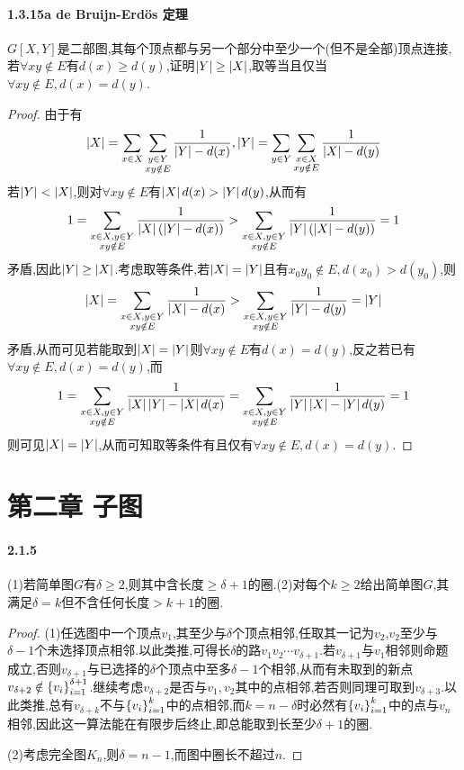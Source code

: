 \documentclass[11pt]{article}
\begin{document}
\paragraph{1.3.15a de Bruijn-Erd\"os 定理}$G[X, Y]$是二部图,其每个顶点都与另一个部分中至少一个(但不是全部)顶点连接,若$\forall xy\notin E$有$d(x)\geq d(y)$,证明$\left|Y\right|\geq \left|X\right|$,取等当且仅当$\forall xy\notin E, d(x)=d(y)$.
\begin{proof}
由于有
$$\left|X\right|=\sum_{x\in X}\sum_{\substack{y\in Y\\ xy\notin E}}\frac{1}{\left|Y\right|-d(x)}, \left|Y\right|=\sum_{y\in Y}\sum_{\substack{x\in X\\ xy\notin E}}\frac{1}{\left|X\right|-d(y)}$$
若$\left|Y\right|<\left|X\right|$,则对$\forall xy\notin E$有$\left|X\right|d(x)>\left|Y\right|d(y)$,从而有
$$1=\sum_{\substack{x\in X, y\in Y\\ xy\notin E}}\frac{1}{\left|X\right|(\left|Y\right|-d(x))}>\sum_{\substack{x\in X, y\in Y\\ xy\notin E}}\frac{1}{\left|Y\right|(\left|X\right|-d(y))}=1$$
矛盾,因此$\left|Y\right|\geq \left|X\right|$.考虑取等条件,若$\left|X\right|=\left|Y\right|$且有$x_0y_0\notin E, d(x_0)>d(y_0)$,则
$$\left|X\right|=\sum_{\substack{x\in X, y\in Y\\ xy\notin E}}\frac{1}{\left|X\right|-d(x)}>\sum_{\substack{x\in X, y\in Y\\ xy\notin E}}\frac{1}{\left|Y\right|-d(y)}=\left|Y\right|$$
矛盾,从而可见若能取到$\left|X\right|=\left|Y\right|$则$\forall xy\notin E$有$d(x)=d(y)$,反之若已有$\forall xy\notin E, d(x)=d(y)$,而
$$1=\sum_{\substack{x\in X, y\in Y\\ xy\notin E}}\frac{1}{\left|X\right|\left|Y\right|-\left|X\right|d(x)}=\sum_{\substack{x\in X, y\in Y\\ xy\notin E}}\frac{1}{\left|Y\right|\left|X\right|-\left|Y\right|d(y)}=1$$
则可见$\left|X\right|=\left|Y\right|$,从而可知取等条件有且仅有$\forall xy\notin E, d(x)=d(y)$.
\end{proof}

\section{第二章\; 子图}
\paragraph{2.1.5}(1)若简单图$G$有$\delta\geq 2$,则其中含长度$\geq \delta+1$的圈.(2)对每个$k\geq 2$给出简单图$G$,其满足$\delta=k$但不含任何长度$>k+1$的圈.
\begin{proof}
(1)任选图中一个顶点$v_1$,其至少与$\delta$个顶点相邻,任取其一记为$v_2$,$v_2$至少与$\delta-1$个未选择顶点相邻.以此类推,可得长$\delta$的路$v_1v_2\cdots v_{\delta+1}$.若$v_{\delta+1}$与$v_1$相邻则命题成立,否则$v_{\delta+1}$与已选择的$\delta$个顶点中至多$\delta-1$个相邻,从而有未取到的新点$v_{\delta+2}\notin \left\{v_i\right\}_{i=1}^{\delta+1}$.继续考虑$v_{\delta+2}$是否与$v_1,v_2$其中的点相邻,若否则同理可取到$v_{\delta+3}$.以此类推,总有$v_{\delta+k}$不与$\left\{v_i\right\}_{i=1}^{k}$中的点相邻,而$k=n-\delta$时必然有$\left\{v_i\right\}_{i=1}^{k}$中的点与$v_n$相邻,因此这一算法能在有限步后终止,即总能取到长至少$\delta+1$的圈.

(2)考虑完全图$K_n$,则$\delta=n-1$,而图中圈长不超过$n$.
\end{proof}
\end{document}

